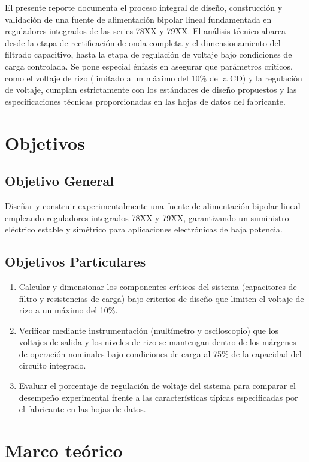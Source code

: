 \documentclass[journal]{IEEEtran}
\begin{document}
    El presente reporte documenta el proceso integral de diseño, construcción y validación de una fuente de alimentación 
    bipolar lineal fundamentada en reguladores integrados de las series 78XX y 79XX. El análisis técnico abarca desde la 
    etapa de rectificación de onda completa y el dimensionamiento del filtrado capacitivo, hasta la etapa de regulación 
    de voltaje bajo condiciones de carga controlada. Se pone especial énfasis en asegurar que parámetros críticos, 
    como el voltaje de rizo (limitado a un máximo del 10\% de la CD) y la regulación de voltaje, cumplan estrictamente con los estándares 
    de diseño propuestos y las especificaciones técnicas proporcionadas en las hojas de datos del fabricante.

\section{Objetivos}
    \subsection{Objetivo General}
    Diseñar y construir experimentalmente una fuente de alimentación bipolar lineal 
    empleando reguladores integrados 78XX y 79XX, garantizando un suministro eléctrico estable y 
    simétrico para aplicaciones electrónicas de baja potencia.

    \subsection{Objetivos Particulares}
    \begin{enumerate}
        \item Calcular y dimensionar los componentes críticos del sistema (capacitores de filtro y resistencias de carga) bajo criterios de diseño que limiten el voltaje de rizo a un máximo del 10\%.
        \item Verificar mediante instrumentación (multímetro y osciloscopio) que los voltajes de salida y los niveles de rizo se mantengan dentro de los márgenes de operación nominales bajo condiciones de carga al 75\% de la capacidad del circuito integrado.
        \item Evaluar el porcentaje de regulación de voltaje del sistema para comparar el desempeño experimental frente a las características típicas especificadas por el fabricante en las hojas de datos.
    \end{enumerate}

\section{Marco teórico}
\end{document}
